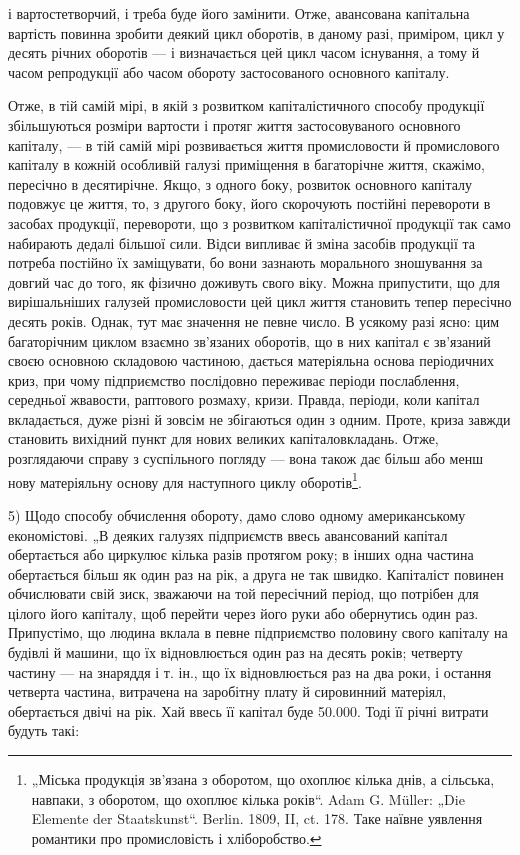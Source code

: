 \parcont{}  %
і вартостетворчий, і треба буде його замінити. Отже, авансована капітальна
вартість повинна зробити деякий цикл оборотів, в даному разі, приміром, цикл
у десять річних оборотів — і визначається цей цикл часом існування,
а тому й часом репродукції або часом обороту застосованого основного
капіталу.

Отже, в тій самій мірі, в якій з розвитком капіталістичного способу
продукції збільшуються розміри вартости і протяг життя застосовуваного
основного капіталу, — в тій самій мірі розвивається життя промисловости
й промислового капіталу в кожній особливій галузі приміщення в багаторічне
життя, скажімо, пересічно в десятирічне. Якщо, з одного боку,
розвиток основного капіталу подовжує це життя, то, з другого боку,
його скорочують постійні перевороти в засобах продукції, перевороти,
що з розвитком капіталістичної продукції так само набирають дедалі
більшої сили. Відси випливає й зміна засобів продукції та потреба постійно
їх заміщувати, бо вони зазнають морального зношування за довгий
час до того, як фізично доживуть свого віку. Можна припустити, що
для вирішальніших галузей промисловости цей цикл життя становить тепер
пересічно десять років. Однак, тут має значення не певне число. В усякому
разі ясно: цим багаторічним циклом взаємно зв’язаних оборотів, що
в них капітал є зв’язаний своєю основною складовою частиною, дається
матеріяльна основа періодичних криз, при чому підприємство послідовно
переживає періоди послаблення, середньої жвавости, раптового розмаху,
кризи. Правда, періоди, коли капітал вкладається, дуже різні й зовсім не
збігаються один з одним. Проте, криза завжди становить вихідний пункт
для нових великих капіталовкладань. Отже, розглядаючи справу з суспільного
погляду — вона також дає більш або менш нову матеріяльну
основу для наступного циклу оборотів\footnote{
„Міська продукція зв’язана з оборотом, що охоплює кілька днів, а сільська,
навпаки, з оборотом, що охоплює кілька років“. Adam G. Müller: „Die Elemente
der Staatskunst“. Berlin. 1809, II, ct. 178. Таке наївне уявлення романтики
про промисловість і хліборобство.
}.

5) Щодо способу обчислення обороту, дамо слово одному американському
економістові. „В деяких галузях підприємств ввесь авансований
капітал обертається або циркулює кілька разів протягом року; в інших
одна частина обертається більш як один раз на рік, а друга не так швидко.
Капіталіст повинен обчислювати свій зиск, зважаючи на той пересічний
період, що потрібен для цілого його капіталу, щоб перейти через його
руки або обернутись один раз. Припустімо, що людина вклала в певне
підприємство половину свого капіталу на будівлі й машини, що їх відновлюється
один раз на десять років; четверту частину — на знаряддя і т. ін.,
що їх відновлюється раз на два роки, і остання четверта частина, витрачена
на заробітну плату й сировинний матеріял, обертається двічі на рік.
Хай ввесь її капітал буде \num{50.000}. Тоді її річні витрати будуть
такі:
